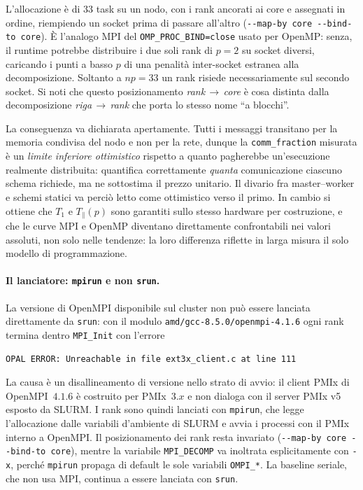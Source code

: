 L'allocazione è di $33$ task su un nodo, con i rank ancorati ai core e assegnati
in ordine, riempiendo un socket prima di passare all'altro
(\texttt{-{}-map-by core -{}-bind-to core}). È l'analogo MPI del
\texttt{OMP\_PROC\_BIND=close} usato per OpenMP: senza, il runtime potrebbe
distribuire i due soli rank di $p=2$ su socket diversi, caricando i punti a
basso $p$ di una penalità inter-socket estranea alla decomposizione. Soltanto a
$np=33$ un rank risiede necessariamente sul secondo socket. Si noti che questo posizionamento \emph{rank\,$\to$\,core}
è cosa distinta dalla decomposizione \emph{riga\,$\to$\,rank} che porta lo stesso
nome ``a blocchi''.

La conseguenza va dichiarata apertamente. Tutti i messaggi transitano per la
memoria condivisa del nodo e non per la rete, dunque la
\texttt{comm\_fraction} misurata è un \emph{limite inferiore ottimistico}
rispetto a quanto pagherebbe un'esecuzione realmente distribuita: quantifica
correttamente \emph{quanta} comunicazione ciascuno schema richiede, ma ne
sottostima il prezzo unitario. Il divario fra master--worker e schemi statici va
perciò letto come ottimistico verso il primo. In cambio si ottiene che $T_1$ e
$T_\parallel(p)$ sono garantiti sullo stesso hardware per costruzione, e che le
curve MPI e OpenMP diventano direttamente confrontabili nei valori assoluti, non
solo nelle tendenze: la loro differenza riflette in larga misura il solo
modello di programmazione.

\paragraph{Il lanciatore: \texttt{mpirun} e non \texttt{srun}.}
La versione di OpenMPI disponibile sul cluster non può essere lanciata
direttamente da \texttt{srun}: con il modulo \texttt{amd/gcc-8.5.0/openmpi-4.1.6}
ogni rank termina dentro \texttt{MPI\_Init} con l'errore
\begin{verbatim}
OPAL ERROR: Unreachable in file ext3x_client.c at line 111
\end{verbatim}
La causa è un disallineamento di versione nello strato di avvio: il client PMIx
di OpenMPI~$4.1.6$ è costruito per PMIx~$3.x$ e non dialoga con il server PMIx
v5 esposto da SLURM. I rank sono quindi lanciati con \texttt{mpirun}, che legge
l'allocazione dalle variabili d'ambiente di SLURM e avvia i processi con il PMIx
interno a OpenMPI. Il posizionamento dei rank resta invariato
(\texttt{-{}-map-by core -{}-bind-to core}), mentre la variabile
\texttt{MPI\_DECOMP} va inoltrata esplicitamente con \texttt{-x}, perché
\texttt{mpirun} propaga di default le sole variabili \texttt{OMPI\_*}. La
baseline seriale, che non usa MPI, continua a essere lanciata con \texttt{srun}.

